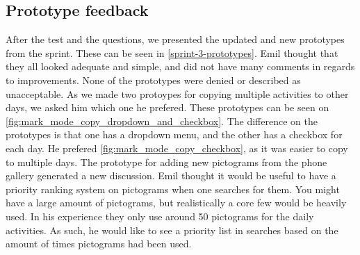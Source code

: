 \subsection{Prototype feedback}
After the test and the questions, we presented the updated and new prototypes from the sprint.
These can be seen in \autoref{sprint-3-prototypes}.
Emil thought that they all looked adequate and simple, and did not have many comments in regards to improvements.
None of the prototypes were denied or described as unacceptable.
As we made two protoypes for copying multiple activities to other days, we asked him which one he prefered.
These prototypes can be seen on \autoref{fig:mark_mode_copy_dropdown_and_checkbox}.
The difference on the prototypes is that one has a dropdown menu, and the other has a checkbox for each day.
He prefered \autoref{fig:mark_mode_copy_checkbox}, as it was easier to copy to multiple days.
The prototype for adding new pictograms from the phone gallery generated a new discussion.
Emil thought it would be useful to have a priority ranking system on pictograms when one searches for them.
You might have a large amount of pictograms, but realistically a core few would be heavily used.
In his experience they only use around 50 pictograms for the daily activities. 
As such, he would like to see a priority list in searches based on the amount of times pictograms had been used.
